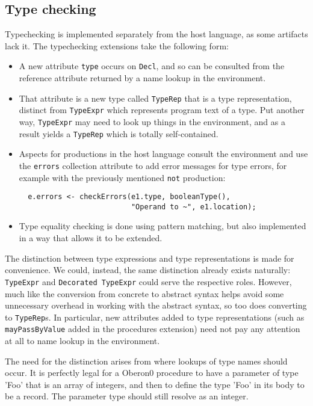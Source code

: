 \subsection{Type checking}

Typechecking is implemented separately from the host language, as some artifacts
lack it.
%
The typechecking extensions take the following form:
\begin{itemize}
\item A new attribute \texttt{type} occurs on \texttt{Decl}, and so can be
 consulted from the reference attribute returned by a name lookup in the
 environment.
\item That attribute is a new type called \texttt{TypeRep} that is a type
 representation, distinct from \texttt{TypeExpr} which represents program
 text of a type. Put another way, \texttt{TypeExpr} may need to look up things
 in the environment, and as a result yields a \texttt{TypeRep} which is totally
 self-contained.
\item Aspects for productions in the host language consult the environment
 and use the \texttt{errors} collection attribute to add error messages
 for type errors, for example with the previously mentioned \texttt{not} production:
\begin{verbatim}
  e.errors <- checkErrors(e1.type, booleanType(), 
                          "Operand to ~", e1.location);
\end{verbatim}
\item Type equality checking is done using pattern matching, but also implemented
 in a way that allows it to be extended.
\end{itemize}

The distinction between type expressions and type representations is made for
convenience.
%
We could, instead, the same distinction already exists naturally:
\texttt{TypeExpr} and \texttt{Decorated TypeExpr} could serve the respective
roles.
%
However, much like the conversion from concrete to abstract syntax helps
avoid some unnecessary overhead in working with the abstract syntax, so
too does converting to \texttt{TypeRep}s.
%
In particular, new attributes added to type representations
(such as \texttt{mayPassByValue} added in the procedures extension) need not pay
any attention at all to name lookup in the environment.

The need for the distinction arises from where lookups of type names should
occur.
%
It is perfectly legal for a Oberon0 procedure to have a parameter of type
'Foo' that is an array of integers, and then to define the type 'Foo' in
its body to be a record.
%
The parameter type should still resolve as an integer.

